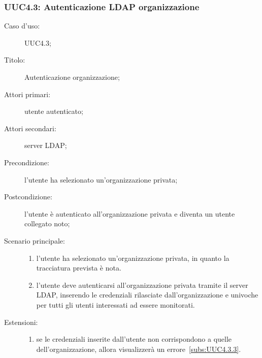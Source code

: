 \documentclass[../../../analisi-dei-requisiti.tex]{subfiles}
\begin{document}
\subsubsection{UUC4.3: Autenticazione LDAP organizzazione}%
\label{subs:UUC4.3}
\begin{description}
  \item[Caso d’uso:] UUC4.3;
  \item[Titolo:] Autenticazione organizzazione;
  \item[Attori primari:] utente autenticato;
  \item[Attori secondari:] server LDAP\@;
  \item[Precondizione:] l'utente ha selezionato un'organizzazione privata;
  \item[Postcondizione:] l'utente è autenticato all'organizzazione privata e diventa un utente collegato noto;
  \item[Scenario principale:]
        \begin{enumerate}
          \item l'utente ha selezionato un'organizzazione privata, in quanto la tracciatura prevista è nota.
          \item l'utente deve autenticarsi all'organizzazione privata tramite il server LDAP, inserendo le credenziali rilasciate dall'organizzazione e univoche per tutti gli utenti interessati ad essere monitorati.
        \end{enumerate}
  \item[Estensioni:]
        \begin{enumerate}
          \item se le credenziali inserite dall'utente non corrispondono a quelle dell'organizzazione, allora visualizzerà un errore~\ref{subs:UUC4.3.3}.
        \end{enumerate}
\end{description}
\end{document}
